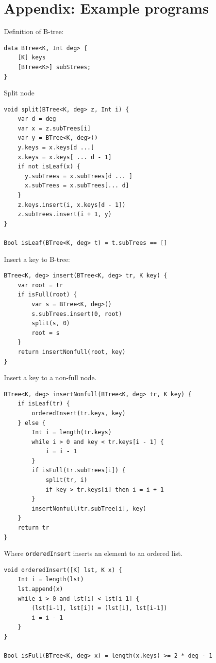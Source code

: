 \documentclass[b5paper]{article}
\begin{document}
\section{Appendix: Example programs}

Definition of B-tree:

\begin{lstlisting}[language = Bourbaki]
data BTree<K, Int deg> {
    [K] keys
    [BTree<K>] subStrees;
}
\end{lstlisting}

Split node

\begin{lstlisting}[language = Bourbaki]
void split(BTree<K, deg> z, Int i) {
    var d = deg
    var x = z.subTrees[i]
    var y = BTree<K, deg>()
    y.keys = x.keys[d ...]
    x.keys = x.keys[ ... d - 1]
    if not isLeaf(x) {
      y.subTrees = x.subTrees[d ... ]
      x.subTrees = x.subTrees[... d]
    }
    z.keys.insert(i, x.keys[d - 1])
    z.subTrees.insert(i + 1, y)
}

Bool isLeaf(BTree<K, deg> t) = t.subTrees == []
\end{lstlisting}

Insert a key to B-tree:

\begin{lstlisting}[language = Bourbaki]
BTree<K, deg> insert(BTree<K, deg> tr, K key) {
    var root = tr
    if isFull(root) {
        var s = BTree<K, deg>()
        s.subTrees.insert(0, root)
        split(s, 0)
        root = s
    }
    return insertNonfull(root, key)
}
\end{lstlisting}

Insert a key to a non-full node.

\begin{lstlisting}[language = Bourbaki]
BTree<K, deg> insertNonfull(BTree<K, deg> tr, K key) {
    if isLeaf(tr) {
        orderedInsert(tr.keys, key)
    } else {
        Int i = length(tr.keys)
        while i > 0 and key < tr.keys[i - 1] {
            i = i - 1
        }
        if isFull(tr.subTrees[i]) {
            split(tr, i)
            if key > tr.keys[i] then i = i + 1
        }
        insertNonfull(tr.subTree[i], key)
    }
    return tr
}
\end{lstlisting}

Where \texttt{orderedInsert} inserts an element to an ordered list.

\begin{lstlisting}[language = Bourbaki]
void orderedInsert([K] lst, K x) {
    Int i = length(lst)
    lst.append(x)
    while i > 0 and lst[i] < lst[i-1] {
        (lst[i-1], lst[i]) = (lst[i], lst[i-1])
        i = i - 1
    }
}

Bool isFull(BTree<K, deg> x) = length(x.keys) >= 2 * deg - 1
\end{lstlisting}
\end{document}

